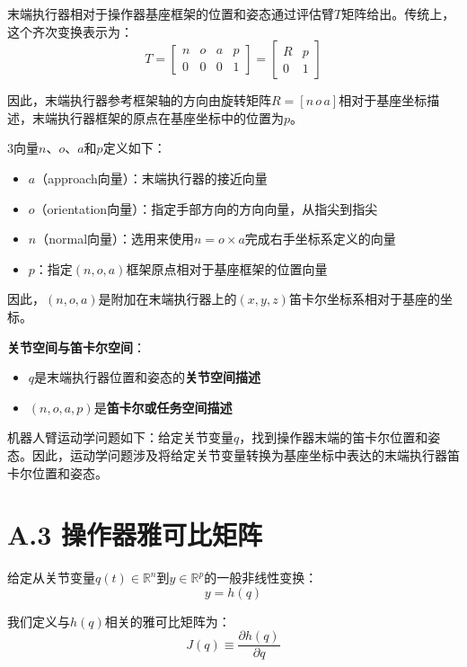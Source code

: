 \documentclass[UTF8,a4paper]{ctexart}
\begin{document}
末端执行器相对于操作器基座框架的位置和姿态通过评估臂$T$矩阵给出。传统上，这个齐次变换表示为：
\begin{equation}
T = \begin{bmatrix} n & o & a & p \\ 0 & 0 & 0 & 1 \end{bmatrix} = \begin{bmatrix} R & p \\ 0 & 1 \end{bmatrix}
\tag{A.2.11}
\end{equation}

因此，末端执行器参考框架轴的方向由旋转矩阵$R = [n \, o \, a]$相对于基座坐标描述，末端执行器框架的原点在基座坐标中的位置为$p$。

3向量$n$、$o$、$a$和$p$定义如下：
\begin{itemize}
    \item $a$（approach向量）：末端执行器的接近向量
    \item $o$（orientation向量）：指定手部方向的方向向量，从指尖到指尖
    \item $n$（normal向量）：选用来使用$n = o \times a$完成右手坐标系定义的向量
    \item $p$：指定$(n, o, a)$框架原点相对于基座框架的位置向量
\end{itemize}

因此，$(n, o, a)$是附加在末端执行器上的$(x, y, z)$笛卡尔坐标系相对于基座的坐标。

\textbf{关节空间与笛卡尔空间}：
\begin{itemize}
    \item $q$是末端执行器位置和姿态的\textbf{关节空间描述}
    \item $(n, o, a, p)$是\textbf{笛卡尔或任务空间描述}
\end{itemize}

机器人臂运动学问题如下：给定关节变量$q$，找到操作器末端的笛卡尔位置和姿态。因此，运动学问题涉及将给定关节变量转换为基座坐标中表达的末端执行器笛卡尔位置和姿态。

\section{A.3 操作器雅可比矩阵}

给定从关节变量$q(t) \in \mathbb{R}^n$到$y \in \mathbb{R}^p$的一般非线性变换：
\begin{equation}
y = h(q)
\tag{A.3.1}
\end{equation}

我们定义与$h(q)$相关的雅可比矩阵为：
\begin{equation}
J(q) \equiv \frac{\partial h(q)}{\partial q}
\tag{A.3.2}
\end{equation}
\end{document}
